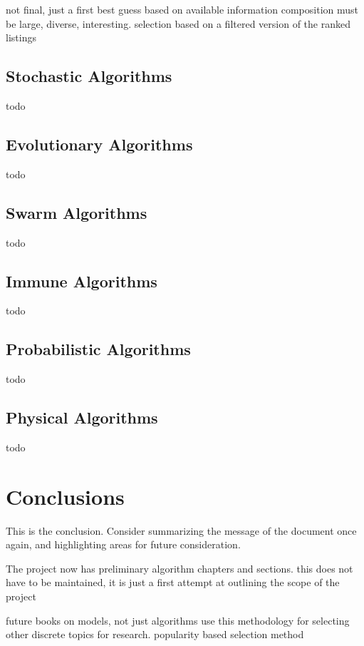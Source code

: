 \documentclass[a4paper, 11pt]{article}
\begin{document}
not final, just a first best guess based on available information
composition must be large, diverse, interesting. 
selection based on a filtered version of the ranked listings

\subsection{Stochastic Algorithms}
todo

\subsection{Evolutionary Algorithms}
todo

\subsection{Swarm Algorithms}
todo

\subsection{Immune Algorithms}
todo

\subsection{Probabilistic Algorithms}
todo

\subsection{Physical Algorithms}
todo

% 
% 
\section{Conclusions}
\label{sec:conclusions}
This is the conclusion. Consider summarizing the message of the document once again, and highlighting areas for future consideration.

The project now has preliminary algorithm chapters and sections.
this does not have to be maintained, it is just a first attempt at outlining the scope of the project

future books on models, not just algorithms
use this methodology for selecting other discrete topics for research. popularity based selection method



\end{document}
